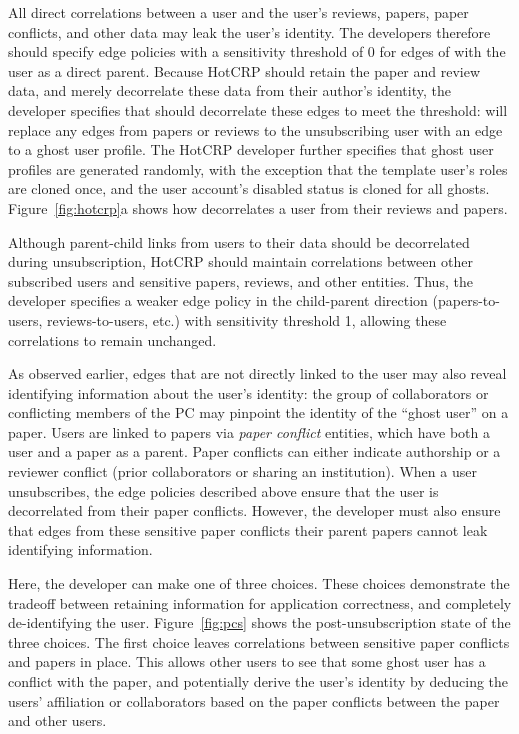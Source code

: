 All direct correlations between a user and the user's reviews, papers, paper conflicts, and other
data may leak the user's identity. The developers therefore should specify edge policies with a sensitivity
threshold of 0 for edges of with the user as a direct parent. 
Because HotCRP should retain the paper and review data, and merely decorrelate these data from their
author's identity, the developer specifies that \sys should decorrelate these edges to meet the
threshold: \sys will replace any edges from papers or reviews to the unsubscribing user with an edge
to a ghost user profile. The HotCRP developer further specifies that ghost user profiles are
generated randomly, with the exception that the template user's roles are cloned once, and the user
account's disabled status is cloned for all ghosts.
Figure~\ref{fig:hotcrp}a shows how \sys decorrelates a user from their reviews and papers.

Although parent-child links from users to their data should be decorrelated during unsubscription,
HotCRP should maintain correlations between other subscribed users and sensitive papers, reviews,
and other entities. Thus, the developer specifies a weaker edge policy in the child-parent
direction (papers-to-users, reviews-to-users, etc.) with sensitivity threshold 1, allowing these
correlations to remain unchanged.

As observed earlier, edges that are not directly linked to the user may also reveal identifying
information about the user's identity: the group of collaborators or conflicting members of the PC
may pinpoint the identity of the ``ghost user'' on a paper. Users are linked to papers via
\emph{paper conflict} entities, which have both a user and a paper as a parent.  Paper conflicts can
either indicate authorship or a reviewer conflict (prior collaborators or sharing an institution).
When a user unsubscribes, the edge policies described above ensure that the user is decorrelated from
their paper conflicts. However, the developer must also ensure that edges from these sensitive paper
conflicts their parent papers cannot leak identifying information.

Here, the developer can make one of three choices. These choices demonstrate the tradeoff between
retaining information for application correctness, and completely de-identifying the user.
Figure~\ref{fig:pcs} shows the post-unsubscription state of the three choices.
%
The first choice leaves correlations between sensitive paper conflicts and papers in place.
This allows other users to see that some ghost user has a conflict with the paper, and potentially
derive the user's identity by deducing the users' affiliation or collaborators based on the
paper conflicts between the paper and other users.

